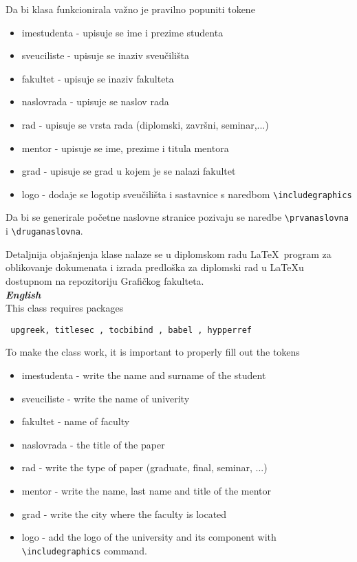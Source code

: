 \documentclass{unizgklasa}
\begin{document}
Da bi klasa funkcionirala važno je pravilno popuniti tokene \begin{itemize}
\item imestudenta - upisuje se ime i prezime studenta
\item sveuciliste - upisuje se inaziv sveučilišta
\item fakultet - upisuje se inaziv fakulteta
\item naslovrada - upisuje se naslov rada
\item rad - upisuje se vrsta rada (diplomski, završni, seminar,...)
\item mentor - upisuje se ime, prezime i titula mentora
\item grad - upisuje se grad u kojem je se nalazi fakultet
\item logo - dodaje se logotip sveučilišta i sastavnice s naredbom \verb=\includegraphics=
\end{itemize}
 
Da bi se generirale početne naslovne stranice pozivaju se naredbe \verb=\prvanaslovna= i \verb=\druganaslovna=.
 
Detaljnija objašnjenja klase nalaze se u diplomskom radu \LaTeX\ program za oblikovanje dokumenata i izrada predloška za diplomski rad u \LaTeX\-u dostupnom na repozitoriju Grafičkog fakulteta.\\

\textit{\textbf{English}}\\
This class requires packages  \begin{verbatim} upgreek, titlesec , tocbibind , babel , hypperref
\end{verbatim}

To make the class work, it is important to properly fill out the tokens \begin{itemize}
\item imestudenta - write the name and surname of the student
\item sveuciliste - write the name of univerity
\item fakultet - name of faculty
\item naslovrada - the title of the paper
\item rad - write the type of paper (graduate, final, seminar, ...)
\item mentor - write the name, last name and title of the mentor
\item grad - write the city where the faculty is located
\item logo - add the logo of the university and its component with \verb=\includegraphics= command.
\end{itemize}
\end{document}
